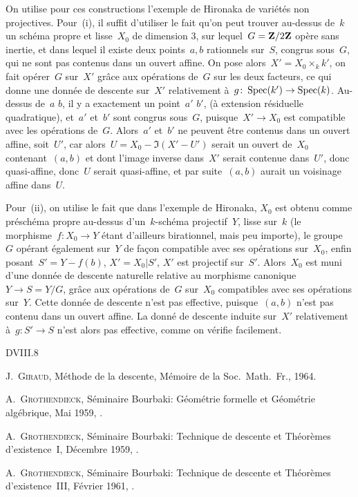 \begin{remarques}
On utilise pour ces constructions l'exemple de Hironaka de
vari\'et\'es non projectives. Pour~(i), il suffit d'utiliser le
fait qu'on peut trouver au-dessus de~$k$ un sch\'ema propre et
lisse~$X_{0}$ de dimension 3, sur lequel~$G=\mathbf{Z}/2\mathbf{Z}$ op\`ere sans
inertie, et dans lequel il existe deux points~$a,b$ rationnels
sur~$S$,
congrus sous~$G$, qui ne sont pas contenus dans un ouvert affine. On
pose alors~$X'=X_{0}\times_{k}k'$, on fait op\'erer~$G$ sur~$X'$
gr\^ace aux op\'erations de~$G$ sur les deux facteurs, ce qui
donne une donn\'ee de descente sur~$X'$ relativement \`a~$g\colon
\Spec(k')\to \Spec(k)$. Au-dessus de~$a$ \resp $b$, il y a exactement
un point~$a'$ \resp $b'$, (\`a extension r\'esiduelle
quadratique), et~$a'$ et~$b'$ sont congrus sous~$G$, puisque~$X'\to
X_{0}$ est compatible avec les op\'erations de~$G$. Alors~$a'$
et~$b'$ ne peuvent \^etre contenus dans un ouvert affine, soit~$U'$,
car alors~$U=X_{0}-\Im(X'-U')$ serait un ouvert de~$X_{0}$
contenant~$(a,b)$ et dont l'image inverse dans~$X'$ serait contenue
dans~$U'$, donc quasi-affine, donc~$U$ serait quasi-affine, et par
suite~$(a,b)$ aurait un voisinage affine dans~$U$.

Pour~(ii), on utilise le fait que dans l'exemple de Hironaka, $X_{0}$
est obtenu comme pr\'esch\'ema propre au-dessus
d'un~$k$-sch\'ema projectif~$Y$, lisse sur~$k$ (le
morphisme~$f\colon X_{0}\to Y$ \'etant d'ailleurs birationnel, mais
peu importe), le groupe~$G$ op\'erant \'egalement sur~$Y$ de
fa\c con compatible avec ses op\'erations sur~$X_{0}$, enfin
posant~$S'=Y-f(b)$, $X'=X_{0}|S'$, $X'$ est projectif
sur~$S'$. Alors~$X_{0}$ est muni d'une donn\'ee de descente
naturelle relative au morphisme
canonique~$Y\to S=Y/G$, gr\^ace aux op\'erations de~$G$
sur~$X_{0}$ compatibles avec ses op\'erations sur~$Y$. Cette
donn\'ee de descente n'est pas effective, puisque~$(a,b)$ n'est pas
contenu dans un ouvert affine. La donn\'e de descente induite
sur~$X'$ relativement \`a~$g\colon S'\to S$ n'est alors pas
effective, comme on v\'erifie facilement.
\end{remarques}

\begin{thebibliography}{D}{VIII.8}

 J.\, \textsc{Giraud}, M\'ethode de la descente, M\'emoire 
de la Soc.\ Math.\ Fr., 1964.

 A.\, \textsc{Grothendieck}, S\'eminaire Bourbaki:
G\'eom\'etrie formelle et G\'eom\'etrie alg\'ebrique, Mai
1959, .

 A.\, \textsc{Grothendieck}, S\'eminaire Bourbaki: Technique de
descente et Th\'eor\`emes d'existence~I, D\'ecembre 1959,
.

 A.\, \textsc{Grothendieck}, S\'eminaire Bourbaki: Technique de
descente et Th\'eor\`emes d'existence~III, F\'evrier 1961,
.
\end{thebibliography}

